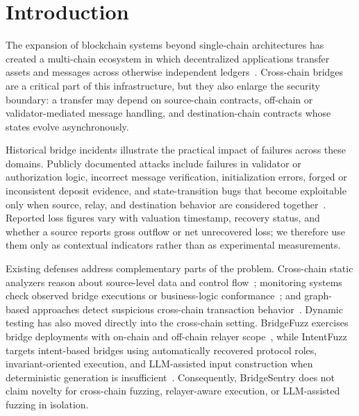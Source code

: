 
\section{Introduction}\label{sec:introduction}

The expansion of blockchain systems beyond single-chain architectures has created a multi-chain ecosystem in which decentralized applications transfer assets and messages across otherwise independent ledgers~\citep{belchior2021survey,augusto2024sok}. Cross-chain bridges are a critical part of this infrastructure, but they also enlarge the security boundary: a transfer may depend on source-chain contracts, off-chain or validator-mediated message handling, and destination-chain contracts whose states evolve asynchronously.

Historical bridge incidents illustrate the practical impact of failures across these domains. Publicly documented attacks include failures in validator or authorization logic, incorrect message verification, initialization errors, forged or inconsistent deposit evidence, and state-transition bugs that become exploitable only when source, relay, and destination behavior are considered together~\citep{lee2023sok,duan2023attacks,liao2024smartaxe}. Reported loss figures vary with valuation timestamp, recovery status, and whether a source reports gross outflow or net unrecovered loss; we therefore use them only as contextual indicators rather than as experimental measurements.

Existing defenses address complementary parts of the problem. Cross-chain static analyzers reason about source-level data and control flow~\citep{liao2024smartaxe,zhou2025bridgeguard}; monitoring systems check observed bridge executions or business-logic conformance~\citep{zhang2022xscope,eshghie2024highguard,augusto2025xchainwatcher}; and graph-based approaches detect suspicious cross-chain transaction behavior~\citep{wu2025safeguarding,lin2025bridgeshield}. Dynamic testing has also moved directly into the cross-chain setting. BridgeFuzz exercises bridge deployments with on-chain and off-chain relayer scope~\citep{winkler2026bridgefuzz}, while IntentFuzz targets intent-based bridges using automatically recovered protocol roles, invariant-oriented execution, and LLM-assisted input construction when deterministic generation is insufficient~\citep{augusto2026intentfuzz}. Consequently, BridgeSentry does not claim novelty for cross-chain fuzzing, relayer-aware execution, or LLM-assisted fuzzing in isolation.

